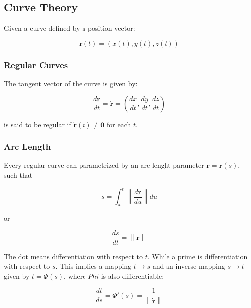 \documentclass{article}
\newcommand\norm[1]{\left\lVert#1\right\rVert}
\begin{document}
\subsection{Curve Theory}

Given a curve defined by a position vector:

\begin{equation}
	\mathbf{ r }( t ) = ( x(t), y(t), z(t) )
\end{equation}

\subsubsection{Regular Curves}

The tangent vector of the curve is given by:

\begin{equation}
	\frac{ d \mathbf{ r } }{ dt } = \dot{ \mathbf{ r } } = \left( \frac{ dx }{ dt }, \frac{ dy }{ dt }, \frac{ dz }{ dt } \right)
\end{equation}

\noindent
is said to be regular if $\dot{ \mathbf{ r } }(t) \neq \mathbf{ 0 }$ for each $t$.


\subsubsection{Arc Length}

Every regular curve can parametrized by an arc lenght parameter $\mathbf{ r } = \mathbf{ r }(s)$, such that

\begin{equation}
	s = \int_a^t \norm{ \frac{ d \mathbf{ r } }{ du } } du
\end{equation}

or

\begin{equation}
	\frac{ ds }{ dt } = \norm{ \dot{ \mathbf{ r } } }
\end{equation}

The dot means differentiation with respect to $t$.  While a prime is differentiation with respect to $s$.  This implies a mapping $t \rightarrow s$ and an inverse mapping $s \rightarrow t$ given by $t = \Phi(s)$, where $Phi$ is also differentiable:

\begin{equation}
	\frac{ dt }{ ds } = \Phi'(s) = \frac{ 1 }{ \norm{ \dot{ \mathbf{ r } } } }
\end{equation}
\end{document}
